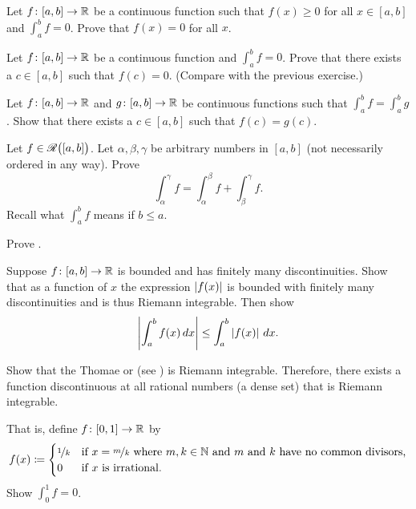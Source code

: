 \begin{exercise}
Let $f \colon [a,b] \to {\mathbb{R}}$ be a continuous function such that $f(x) \geq 0$
for all $x \in [a,b]$ and $\int_a^b f = 0$.  Prove that $f(x) = 0$
for all $x$.
\end{exercise}

\begin{exercise}
Let $f \colon [a,b] \to {\mathbb{R}}$ be a continuous function
and $\int_a^b f = 0$.  Prove that
there exists a $c \in [a,b]$ such that $f(c) = 0$. (Compare with the
previous exercise.)
\end{exercise}

\begin{exercise}
Let $f \colon [a,b] \to {\mathbb{R}}$ and $g \colon [a,b] \to {\mathbb{R}}$
be continuous functions such that $\int_a^b f = \int_a^b g$.
Show that there exists a $c \in [a,b]$ such that $f(c) = g(c)$.
\end{exercise}

\begin{exercise}
Let $f \in {\mathscr{R}}\bigl([a,b]\bigr)$.  Let $\alpha, \beta, \gamma$ be arbitrary numbers in
$[a,b]$ (not necessarily ordered in any way).  Prove 
\begin{equation*}
\int_\alpha^\gamma f =
\int_\alpha^\beta f +
\int_\beta^\gamma f .
\end{equation*}
Recall what $\int_a^b f$ means if $b \leq a$.
\end{exercise}

\begin{exercise}
Prove .
\end{exercise}

\begin{exercise} \label{exercise:easyabsint}
Suppose $f \colon [a,b] \to {\mathbb{R}}$ is bounded and
has finitely many discontinuities.
Show that as a function of $x$ the expression $\left\lvert {f(x)} \right\rvert$ is bounded with finitely many
discontinuities and is thus Riemann integrable.  Then show 
\begin{equation*}
\left\lvert {\int_a^b f(x)\,dx} \right\rvert \leq \int_a^b \left\lvert {f(x)} \right\rvert\,dx .
\end{equation*}
\end{exercise}

\begin{exercise}[Hard]
Show that the
Thomae or 
(see )
is Riemann integrable.  Therefore, there exists a
function discontinuous at all rational numbers (a dense set)
that is Riemann integrable.

That is,
define $f \colon [0,1] \to {\mathbb{R}}$ by
\begin{equation*}
f(x) \coloneqq 
\begin{cases}
\nicefrac{1}{k} & \text{if } x=\nicefrac{m}{k} \text{ where }
m,k \in {\mathbb{N}} \text{ and } m \text{ and } k \text{ have no common divisors,} \\
0               & \text{if } x \text{ is irrational.}
\end{cases}
\end{equation*}
Show $\int_0^1 f = 0$.
\end{exercise}


